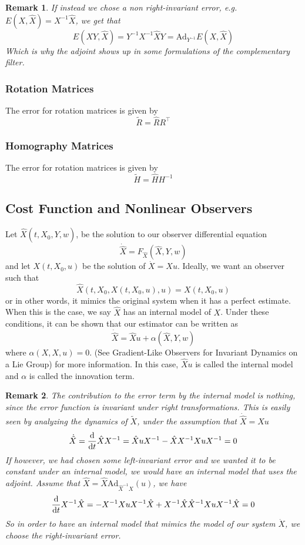 \documentclass[a4paper]{article}
\newtheorem*{rem}{Remark}
\begin{document}
\begin{rem}
  If instead we chose a non right-invariant error, e.g. $E(X,\hat{X}) = X^{-1}\hat{X}$, we get that
  \[
    E(XY, \hat{X}) = Y^{-1}X^{-1}\hat{X}Y = \text{Ad}_{Y^{-1}}E(X,\hat{X})
  \]
  Which is why the adjoint shows up in some formulations of the complementary filter.
\end{rem}

\subsubsection*{Rotation Matrices}%
The error for rotation matrices is given by
\[
  \tilde{R} = \hat{R}R^\top
\]

\subsubsection*{Homography Matrices}%
The error for rotation matrices is given by
\[
  \tilde{H} = \hat{H}H^{-1}
\]

\subsection*{Cost Function and Nonlinear Observers}%
Let $ \hat{X}(t, \hat{X}_0, Y, w)$, be the solution to our observer differential equation
\[
  \dot{\hat{X}} = F_{\hat{X}}(\hat{X}, Y, w)
\]
and let $X(t, X_0, u)$ be the solution of $\dot{X} = Xu$. Ideally, we want an observer such that
\[
  \hat{X}(t, X_0, X(t, X_0, u), u) = X(t, X_0, u)
\]
or in other words, it mimics the original system when it has a perfect estimate. When this is the case, we say $\hat{X}$ has an internal model of $X$. Under these conditions, it can be shown that our estimator can be written as
\[
  \dot{\hat{X}} = \hat{X}u + \alpha(\hat{X}, Y, w)
\]
where $\alpha(X,X,u) = 0$. (See Gradient-Like Observers for Invariant Dynamics on a Lie Group) for more information. In this case, $\hat{X}u$ is called the internal model and $\alpha$ is called the innovation term. 

\begin{rem}
  The contribution to the error term by the internal model is nothing, since the error function is invariant under right transformations. This is easily seen by analyzing the dynamics of $\tilde{X}$, under the assumption that $\dot{\hat{X}} = \hat{X}u$ 
  \[
    \dot{\tilde{X}} = \dv{}{t}\hat{X}X^{-1} = \hat{X}uX^{-1} - \hat{X}X^{-1}XuX^{-1} = 0
  \]
  If however, we had chosen some left-invariant error and we wanted it to be constant under an internal model, we would have an internal model that uses the adjoint. Assume that $\hat{X} = \hat{X} \text{Ad}_{\hat{X}^{-1}X}(u)$, we have
  \[
    \dv{}{t} X^{-1}\hat{X} = -X^{-1}XuX^{-1}\hat{X} + X^{-1}\hat{X}\hat{X}^{-1}XuX^{-1}\hat{X} = 0
  \]
  So in order to have an internal model that mimics the model of our system $\dot{X}$, we choose the right-invariant error.
\end{rem}
\end{document}
